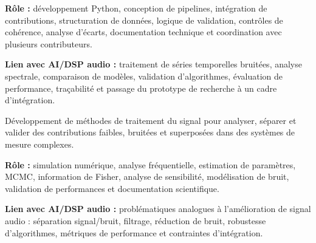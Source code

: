 \documentclass[8pt,a4paper,ragged2e,withhyper]{altacv}
\begin{document}
\textbf{Rôle :} développement Python, conception de pipelines, intégration de contributions, structuration de données, logique de validation, contrôles de cohérence, analyse d’écarts, documentation technique et coordination avec plusieurs contributeurs.

\textbf{Lien avec AI/DSP audio :} traitement de séries temporelles bruitées, analyse spectrale, comparaison de modèles, validation d’algorithmes, évaluation de performance, traçabilité et passage du prototype de recherche à un cadre d’intégration.

\divider


Développement de méthodes de traitement du signal pour analyser, séparer et valider des contributions faibles, bruitées et superposées dans des systèmes de mesure complexes.

\textbf{Rôle :} simulation numérique, analyse fréquentielle, estimation de paramètres, MCMC, information de Fisher, analyse de sensibilité, modélisation de bruit, validation de performances et documentation scientifique.

\textbf{Lien avec AI/DSP audio :} problématiques analogues à l’amélioration de signal audio : séparation signal/bruit, filtrage, réduction de bruit, robustesse d’algorithmes, métriques de performance et contraintes d’intégration.


\vspace{-.3cm}


{\small
{}
}

\divider\smallskip
\vspace{-.3cm}

\end{document}

